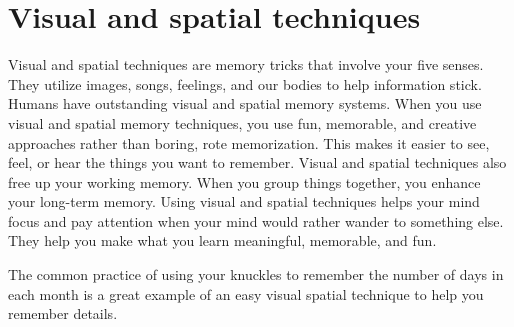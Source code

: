 \documentclass[../main.tex]{subfiles}
\begin{document}
\section{Visual and spatial techniques}
Visual and spatial techniques are memory tricks that involve your five senses.
They utilize images, songs, feelings, and our bodies to help information stick.
Humans have outstanding visual and spatial memory systems. When you use visual
and spatial memory techniques, you use fun, memorable, and creative approaches
rather than boring, rote memorization. This makes it easier to see, feel, or
hear the things you want to remember. Visual and spatial techniques also free up
your working memory. When you group things together, you enhance your long-term
memory. Using visual and spatial techniques helps your mind focus and pay
attention when your mind would rather wander to something else. They help you
make what you learn meaningful, memorable, and fun.

The common practice of using your knuckles to remember the number of days in
each month is a great example of an easy visual spatial technique to help you
remember details.
\\
\end{document}
